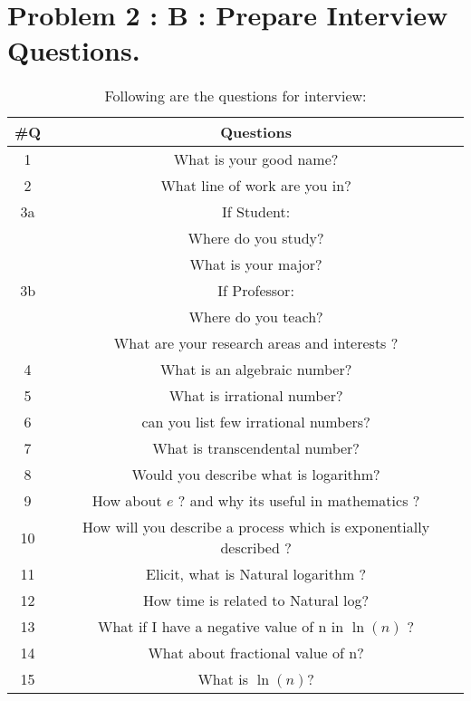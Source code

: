 \documentclass{article}
\begin{document}
\section{Problem 2 : B : Prepare Interview Questions.}
\hfill \break
\begin{table}[h!]
    \begin{center}
        \caption{Following are the questions for interview:}
        \label{tab:table1}
        \begin{tabular}{c|c}
        \toprule
         \textbf{\#Q} & \textbf{Questions}  \\
         \hline
         1 & What is your good name? \\
         \hline
         2 & What line of work are you in? \\
         \hline
         3a & If Student: \\
         & Where do you study? \\
         & What is your major? \\
         \hline
         3b & If Professor: \\
         & Where do you teach? \\
         & What are your research areas and interests ? \\
         \hline
         4 & What is an algebraic number? \\
         \hline
         5 & What is irrational number? \\
         \hline
         6 & can you list few irrational numbers? \\
         \hline
         7 & What is transcendental number? \\
         \hline
         8 & Would you describe what is logarithm? \\
         \hline
         9 & How about $e$ ? and why its useful in mathematics ? \\
         \hline
         10 & How will you describe a process which is exponentially described ? \\
         \hline
         11 & Elicit, what is Natural logarithm ? \\
         \hline
         12 & How time is related to Natural log? \\
         \hline
         13 & What if I have a negative value of n in $\ln(n)$ ? \\
         \hline
         14 & What about fractional value of n? \\
         \hline
         15 & What is $\ln(n)$? \\

\end{tabular}
\end{center}
\end{table}
\end{document}
